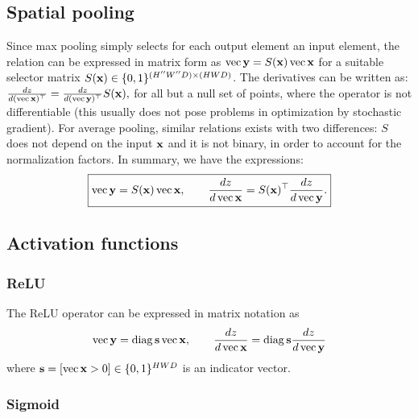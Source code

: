 \subsection{Spatial pooling}\label{s:impl-pooling}

Since max pooling simply selects for each output element an input element, the relation can be expressed in matrix form as
$
\operatorname{vec}\mathbf{y} = S(\mathbf{x}) \operatorname{vec} \mathbf{x}
$
for a suitable selector matrix $S(\mathbf{x})\in\{0,1\}^{(H''W''D) \times (HWD)}$. The derivatives can be written as:
$
\frac{d z}{d (\operatorname{vec} \mathbf{x})^\top}
=
\frac{d z}{d (\operatorname{vec} \mathbf{y})^\top}
S(\mathbf{x}),
$
for all but a null set of points, where the operator is not differentiable (this usually does not pose problems in optimization by stochastic gradient). For average pooling, similar relations exists with two differences: $S$ does not depend on the input $\mathbf{x}$ and it is not binary, in order to account for the normalization factors. In summary, we have the expressions:
\begin{equation}\label{e:max-mat}
\boxed{
	\operatorname{vec}\mathbf{y} = S(\mathbf{x}) \operatorname{vec} \mathbf{x},
	\qquad
	\frac{d z}{d \operatorname{vec} \mathbf{x}}
	=
	S(\mathbf{x})^\top
	\frac{d z}{d \operatorname{vec} \mathbf{y}}.
}
\end{equation}



\subsection{Activation functions}\label{s:impl-activation}

\subsubsection{ReLU}\label{s:impl-relu}

The ReLU operator can be expressed in matrix notation as
\[
\operatorname{vec}\mathbf{y} = \operatorname{diag}\mathbf{s} \operatorname{vec} \mathbf{x},
\qquad
\frac{d z}{d \operatorname{vec} \mathbf{x}}
=
\operatorname{diag}\mathbf{s}
\frac{d z}{d \operatorname{vec} \mathbf{y}}
\]
where $\mathbf{s} = [\operatorname{vec} \mathbf{x} > 0] \in\{0,1\}^{HWD}$ is an indicator vector.

\subsubsection{Sigmoid}\label{s:impl-sigmoid}

